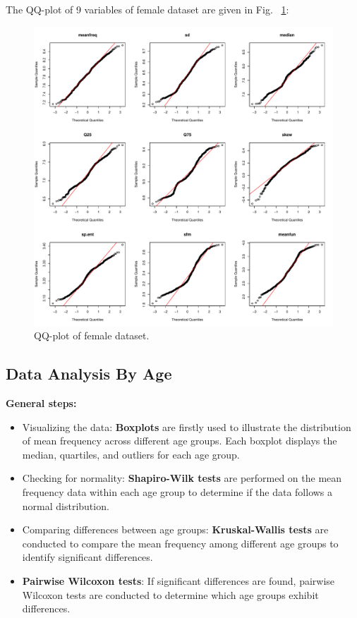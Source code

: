\documentclass{article}
\begin{document}
	The QQ-plot of 9 variables of female dataset are given in Fig. ~\ref{qq_female}:
	\begin{figure}
		\centering
		\includegraphics[width=\textwidth]{graphs/gender/qq_plot_female.pdf}
		\caption{QQ-plot of female dataset.}
		\label{qq_female}
	\end{figure}
	
	\subsection{Data Analysis By Age}
	\textbf{General steps:}
	\begin{itemize}
		\item Visualizing the data: \textbf{Boxplots} are firstly used to illustrate the distribution of mean frequency across different age groups. Each boxplot displays the median, quartiles, and outliers for each age group.
		\item Checking for normality: \textbf{Shapiro-Wilk tests} are performed on the mean frequency data within each age group to determine if the data follows a normal distribution.
		\item Comparing differences between age groups: \textbf{Kruskal-Wallis tests} are conducted to compare the mean frequency among different age groups to identify significant differences.
		\item \textbf{Pairwise Wilcoxon tests}: If significant differences are found, pairwise Wilcoxon tests are conducted to determine which age groups exhibit differences.
	\end{itemize}
	
\end{document}
